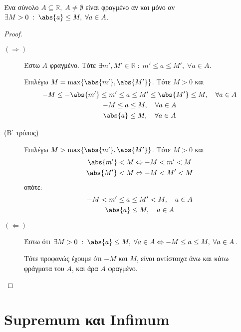 \documentclass[main.tex]{subfiles}
\begin{document}
 \begin{prop}
     Ένα σύνολο $ A \subseteq \mathbb{R}, \; A \neq \emptyset $ είναι 
     φραγμένο αν και μόνο αν $ \exists M>0 \; : \; \abs{a} \leq M, \; 
     \forall a \in A$.
 \end{prop}

 \begin{proof}
 \item {}
    \begin{description}
        \item [$ (\Rightarrow) $] Έστω $A$ φραγμένο. Τότε 
            $ \exists m',M' \in \mathbb{R} \; : \; m' \leq a \leq M', \; 
            \forall a \in A $.
       
            Επιλέγω $ M = \max \{ \abs{m'}, \abs{M'} \} $. Τότε $ M >0 $ και 
            \begin{gather*}
                -M \leq - \abs{m'} \leq m' \leq a \leq M' \leq \abs{M'} 
                \leq M, \quad \forall a \in A \\
                -M \leq a \leq M, \quad \forall a \in A \\
                \abs{a} \leq M, \quad \forall a \in A
            \end{gather*}

        \item [(Β΄ τρόπος)]
            Επιλέγω $ M > \max \{ \abs{m'}, \abs{M'} \} $. Τότε $ M >0 $ και 
\begin{gather*}
    \abs{m'} < M \Leftrightarrow - M < m' < M \\
    \abs{M'} < M \Leftrightarrow -M < M' < M 
\end{gather*}
 οπότε: 
 \begin{gather*}
     -M < m' \leq a \leq M' < M, \quad a \in A \\
     \abs{a} \leq M, \quad a \in A
 \end{gather*}
        

        \item [$ (\Leftarrow) $]
            Έστω ότι $ \exists M>0 \; : \; \abs{a} \leq M, \; \forall a \in 
            A \Leftrightarrow -M \leq a \leq M, \; \forall a \in A$. 
            
            Τότε προφανώς έχουμε ότι $-M $ και $ M $, 
            είναι αντίστοιχα άνω και κάτω φράγματα του $A$, και άρα $A$ 
            φραγμένο.
    \end{description} 
 \end{proof}

 \section{Supremum και Infimum}
\end{document}
